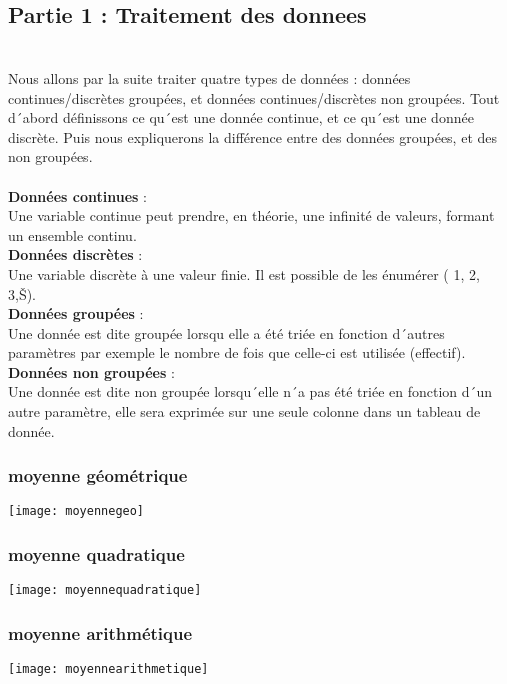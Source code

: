 \documentclass[a4paper,12pt,reqno]{article}
\newcommand{\newparagraphe}[1]{\paragraph{#1}\mbox{}\\}
\begin{document}
\subsection{Partie 1 : Traitement des donnees }
\newparagraphe{}
Nous allons par la suite traiter quatre types de donn\'ees : donn\'ees continues/discr\`{e}tes group\'ees, et donn\'ees continues/discr\`{e}tes non group\'ees. 
Tout d\'\ abord d\'efinissons ce qu\'\ est une donn\'ee continue, et ce qu\'\ est une donn\'ee discr\`{e}te. Puis nous expliquerons la diff\'erence entre des donn\'ees group\'ees, et des non group\'ees.
\\
\\

\textbf{Donn\'ees continues} :
\\Une variable continue peut prendre, en th\'eorie, une infinit\'e de valeurs, formant un ensemble continu.\\

\textbf{Donn\'ees discr\`{e}tes} :
\\Une variable discr\`{e}te \`{a} une valeur finie. Il est possible de les \'enum\'erer (  1, 2, 3,Š).\\ 

\textbf{Donn\'ees group\'ees} :
\\Une donn\'ee est dite group\'ee lorsqu elle a \'et\'e tri\'ee en fonction d\'\ autres param\`{e}tres  par exemple le nombre de fois que celle-ci est utilis\'ee (effectif).\\

\textbf{Donn\'ees non group\'ees} :
\\Une donn\'ee est dite non group\'ee lorsqu\'\ elle n\'\ a pas \'et\'e tri\'ee en fonction d\'\ un autre param\`{e}tre, elle sera exprim\'ee sur une seule colonne dans un tableau de donn\'ee.\\


\subsubsection{moyenne g\'eom\'etrique}
\texttt{[image: moyennegeo]}\\

\subsubsection{moyenne quadratique}
\texttt{[image: moyennequadratique]}\\

\subsubsection{moyenne arithm\'etique}
\texttt{[image: moyennearithmetique]}\\
\end{document}
